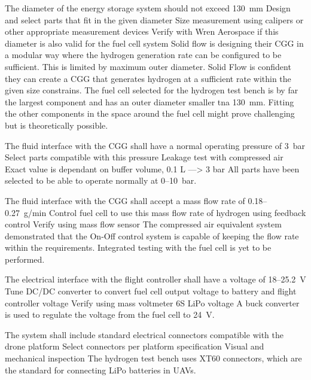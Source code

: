 {The diameter of the energy storage system should not exceed 130~mm}
{Design and select parts that fit in the given diameter}
{Size measurement using calipers or other appropriate measurement devices}
{Verify with Wren Aerospace if this diameter is also valid for the fuel cell system}
{Solid flow is designing their CGG in a modular way where the hydrogen generation rate can be configured to be sufficient. This is limited by maximum outer diameter. Solid Flow is confident they can create a CGG that generates hydrogen at a sufficient rate within the given size constrains. The fuel cell selected for the hydrogen test bench is by far the largest component and has an outer diameter smaller tna 130~mm. Fitting the other components in the space around the fuel cell might prove challenging but is theoretically possible.}
{}

{The fluid interface with the CGG shall have a normal operating pressure of 3~bar}
{Select parts compatible with this pressure}
{Leakage test with compressed air}
{Exact value is dependant on buffer volume, 0.1 L ---> 3 bar}
{All parts have been selected to be able to operate normally at 0--10~bar.}
{}

{The fluid interface with the CGG shall accept a mass flow rate of 0.18--0.27~g/min}
{Control fuel cell to use this mass flow rate of hydrogen using feedback control}
{Verify using mass flow sensor}
{}
{The compressed air equivalent system demonstrated that the On-Off control system is capable of keeping the flow rate within the requirements. Integrated testing with the fuel cell is yet to be performed.}
{}

{The electrical interface with the flight controller shall have a voltage of 18--25.2~V}
{Tune DC/DC converter to convert fuel cell output voltage to battery and flight controller voltage}
{Verify using mass voltmeter}
{6S LiPo voltage}
{A buck converter is used to regulate the voltage from the fuel cell to 24~V.}
{}

{The system shall include standard electrical connectors compatible with the drone platform}
{Select connectors per platform specification}
{Visual and mechanical inspection}
{}
{The hydrogen test bench uses XT60 connectors, which are the standard for connecting LiPo batteries in UAVs.}
{}

